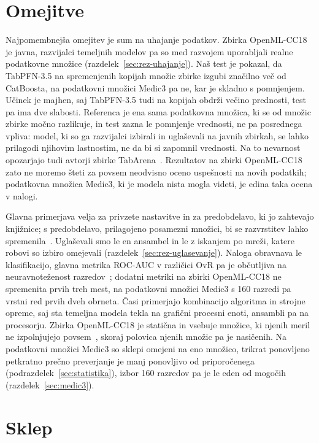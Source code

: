 \documentclass[a4paper,12pt,openright]{book}
\begin{document}
\section{Omejitve}
\label{sec:omejitve}

Najpomembnejša omejitev je sum na uhajanje podatkov. Zbirka OpenML-CC18 je
javna, razvijalci temeljnih modelov pa so med razvojem uporabljali realne
podatkovne množice (razdelek~\ref{sec:rez-uhajanje}). Naš test je pokazal, da
TabPFN-3.5 na spremenjenih kopijah množic zbirke izgubi značilno več od
CatBoosta, na podatkovni množici Medic3 pa ne, kar je skladno s pomnjenjem.
Učinek je majhen, saj TabPFN-3.5 tudi na kopijah obdrži večino prednosti, test
pa ima dve slabosti. Referenca je ena sama podatkovna množica, ki se od množic
zbirke močno razlikuje, in test zazna le pomnjenje vrednosti, ne pa posrednega
vpliva: model, ki so ga razvijalci izbirali in uglaševali na javnih zbirkah, se
lahko prilagodi njihovim lastnostim, ne da bi si zapomnil vrednosti. Na to
nevarnost opozarjajo tudi avtorji zbirke TabArena~\cite{erickson2025tabarena}.
Rezultatov na zbirki OpenML-CC18 zato ne moremo šteti za povsem neodvisno oceno
uspešnosti na novih podatkih; podatkovna množica Medic3, ki je modela nista
mogla videti, je edina taka ocena v nalogi.

Glavna primerjava velja za privzete nastavitve in za predobdelavo, ki jo
zahtevajo knjižnice; s predobdelavo, prilagojeno posamezni množici, bi se
razvrstitev lahko spremenila~\cite{tschalzev2024data}. Uglaševali smo le en
ansambel in le z iskanjem po mreži, katere robovi so izbiro omejevali
(razdelek~\ref{sec:rez-uglasevanje}). Naloga obravnava le klasifikacijo,
glavna metrika ROC-AUC v različici OvR pa je občutljiva na neuravnoteženost
razredov~\cite{sklearndocsroc}; dodatni metriki na zbirki OpenML-CC18 ne
spremenita prvih treh mest, na podatkovni množici Medic3 s 160 razredi pa
vrstni red prvih dveh obrneta. Časi primerjajo
kombinacijo algoritma in strojne opreme, saj sta temeljna modela tekla na
grafični procesni enoti, ansambli pa na procesorju. Zbirka OpenML-CC18 je
statična in vsebuje množice, ki njenih meril ne izpolnjujejo
povsem~\cite{bischl2021openml}, skoraj polovica njenih množic pa je nasičenih.
Na podatkovni množici Medic3 so sklepi omejeni na eno množico, trikrat
ponovljeno petkratno prečno preverjanje je manj ponovljivo od
priporočenega (podrazdelek~\ref{sec:statistika}), izbor 160 razredov pa je le
eden od mogočih (razdelek~\ref{sec:medic3}).

\section{Sklep}
\label{sec:sklep}
\end{document}
